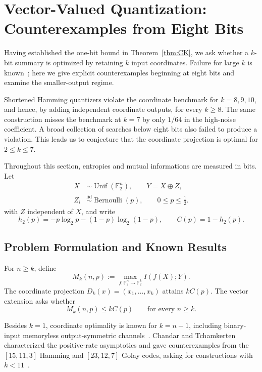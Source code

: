 \section{Vector-Valued Quantization: Counterexamples from Eight Bits}
\label{sec:multibit-extension}

Having established the one-bit bound in Theorem~\ref{thm:CK}, we ask
whether a \(k\)-bit summary is optimized by retaining \(k\) input
coordinates. Failure for large \(k\) is known~\cite{CT}; here we give
explicit counterexamples beginning at eight bits and examine the
smaller-output regime.

Shortened Hamming quantizers violate
the coordinate benchmark for \(k=8,9,10\), and hence, by adding independent
coordinate outputs, for every \(k\geq 8\). The same construction misses the
benchmark at \(k=7\) by only \(1/64\) in the high-noise coefficient. A broad
collection of searches below eight bits also failed to produce a violation.
This leads us to conjecture that the coordinate projection is optimal for
\(2\leq k\leq7\).

Throughout this section, entropies and mutual informations are measured in
bits. Let
\begin{align*}
 X&\sim\operatorname{Unif}(\mathbb F_2^n),\qquad Y=X\oplus Z,\\
 Z_i&\stackrel{\mathrm{iid}}{\sim}\operatorname{Bernoulli}(p),
 \qquad 0\leq p\leq\frac12.
\end{align*}
with \(Z\) independent of \(X\), and write
\[
 h_2(p)=-p\log_2p-(1-p)\log_2(1-p),
 \qquad C(p)=1-h_2(p).
\]

\subsection{Problem Formulation and Known Results}

For \(n\geq k\), define
\begin{equation}
 M_k(n,p):=\max_{f:\mathbb F_2^n\to\mathbb F_2^k}I(f(X);Y).
 \label{eq:multibit-Mkn}
\end{equation}
The coordinate projection \(D_k(x)=(x_1,\ldots,x_k)\) attains
\(kC(p)\). The vector extension asks whether
\begin{equation}
 M_k(n,p)\leq kC(p)\qquad\text{for every }n\geq k.
 \label{eq:vector-CK}
\end{equation}

Besides \(k=1\), coordinate optimality is known for \(k=n-1\), including
binary-input memoryless output-symmetric channels~\cite{HO}.
Chandar and Tchamkerten characterized the positive-rate asymptotics and
gave counterexamples from the \([15,11,3]\) Hamming and \([23,12,7]\)
Golay codes, asking for constructions with \(k<11\)~\cite{CT}.

